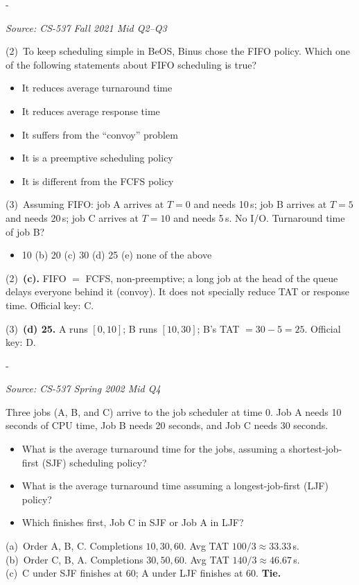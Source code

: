 \documentclass[11pt,a4paper]{article}
\makeatletter
\newcommand{\keepspace}[1]{\par\penalty-100\begingroup
  \setlength{\dimen@}{#1}\dimen@ii\pagegoal\advance\dimen@ii-\pagetotal
  \ifdim\dimen@>\dimen@ii\ifdim\dimen@ii>\z@\vfil\fi\break\fi\endgroup}
\newcounter{qn}[section]
\newenvironment{Qn}[4]{%
  \refstepcounter{qn}\keepspace{7\baselineskip}%
  \begin{tcolorbox}[qboxstyle, title={Q\thesection.\theqn\ \ [#1 \textbar\ #2]\ \ #4}]%
  {\footnotesize\color{g3}\textit{Source: #3}}\par\smallskip%
}{%
  \end{tcolorbox}%
}
\newenvironment{Sol}{%
  \begin{tcolorbox}[sboxstyle, title={Solution}]%
}{%
  \end{tcolorbox}\vspace{0.35em}%
}
\makeatother
\begin{document}
\begin{Qn}{Easy-Medium}{Lect 5--6}{CS-537 Fall 2021 Mid Q2--Q3}{FIFO convoy, and TAT of job B}
(2)~To keep scheduling simple in BeOS, Binus chose the FIFO policy. Which one of the following statements about FIFO scheduling is true?
\begin{itemize}
  \item[(a)] It reduces average turnaround time
  \item[(b)] It reduces average response time
  \item[(c)] It suffers from the ``convoy'' problem
  \item[(d)] It is a preemptive scheduling policy
  \item[(e)] It is different from the FCFS policy
\end{itemize}
(3)~Assuming FIFO: job A arrives at $T=0$ and needs 10\,s; job B arrives at $T=5$ and needs 20\,s; job C arrives at $T=10$ and needs 5\,s. No I/O. Turnaround time of job B?
\begin{itemize}
  \item[(a)] 10 \quad (b) 20 \quad (c) 30 \quad (d) 25 \quad (e) none of the above
\end{itemize}
\end{Qn}
\begin{Sol}
(2)~\textbf{(c).} FIFO $=$ FCFS, non-preemptive; a long job at the head of the queue delays everyone behind it (convoy). It does not specially reduce TAT or response time. Official key: C.

(3)~\textbf{(d) 25.} A runs $[0,10]$; B runs $[10,30]$; B's TAT $=30-5=25$. Official key: D.
\end{Sol}

\begin{Qn}{Easy-Medium}{Lect 5--6}{CS-537 Spring 2002 Mid Q4}{SJF vs.\ LJF turnaround}
Three jobs (A, B, and C) arrive to the job scheduler at time 0. Job A needs 10 seconds of CPU time, Job B needs 20 seconds, and Job C needs 30 seconds.
\begin{itemize}
  \item[(a)] What is the average turnaround time for the jobs, assuming a shortest-job-first (SJF) scheduling policy?
  \item[(b)] What is the average turnaround time assuming a longest-job-first (LJF) policy?
  \item[(c)] Which finishes first, Job C in SJF or Job A in LJF?
\end{itemize}
\end{Qn}
\begin{Sol}
(a)~Order A, B, C. Completions $10,30,60$. Avg TAT $100/3 \approx \mathbf{33.33}$\,s.\\
(b)~Order C, B, A. Completions $30,50,60$. Avg TAT $140/3 \approx \mathbf{46.67}$\,s.\\
(c)~C under SJF finishes at 60; A under LJF finishes at 60. \textbf{Tie.}
\end{Sol}
\end{document}
